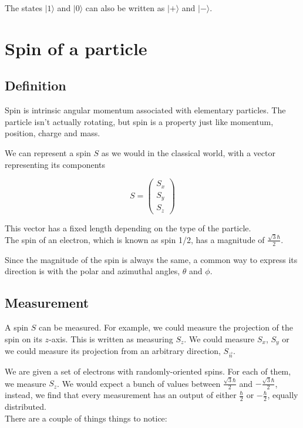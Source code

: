 \documentclass{article}
\begin{document}
The states \(|1\rangle\) and \(|0\rangle\) can also be written as \(|+\rangle\) and \(|-\rangle\).

\pagebreak

\section{Spin of a particle}

\subsection{Definition}

Spin is intrinsic angular momentum associated with elementary particles.
The particle isn't actually rotating, but spin is a property just like momentum, position, charge and mass.

We can represent a spin \(S\) as we would in the classical world, with a vector representing its components

\[
    S=
    \begin{pmatrix}
        S_x \\
        S_y \\
        S_z
    \end{pmatrix}
\]

This vector has a fixed length depending on the type of the particle. \\
The spin of an electron, which is known as spin 1/2, has a magnitude of \(\frac{\sqrt{3}\hbar}{2}\).

Since the magnitude of the spin is always the same, a common way to express its direction is with the polar and azimuthal angles, \(\theta\) and \(\phi\).

\subsection{Measurement}

A spin \(S\) can be measured. For example, we could measure the projection of the spin on its \(z\)-axis.
This is written as measuring \(S_z\). We could measure \(S_x\), \(S_y\) or we could measure its projection from an arbitrary direction, \(S_{\vec{n}}\).

We are given a set of electrons with randomly-oriented spins. For each of them, we measure \(S_z\).
We would expect a bunch of values between \(\frac{\sqrt{3}\hbar}{2}\) and \(-\frac{\sqrt{3}\hbar}{2}\),
instead, we find that every measurement has an output of either \(\frac{\hbar}{2}\) or \(-\frac{\hbar}{2}\), equally distributed. \\
There are a couple of things things to notice:
\end{document}
